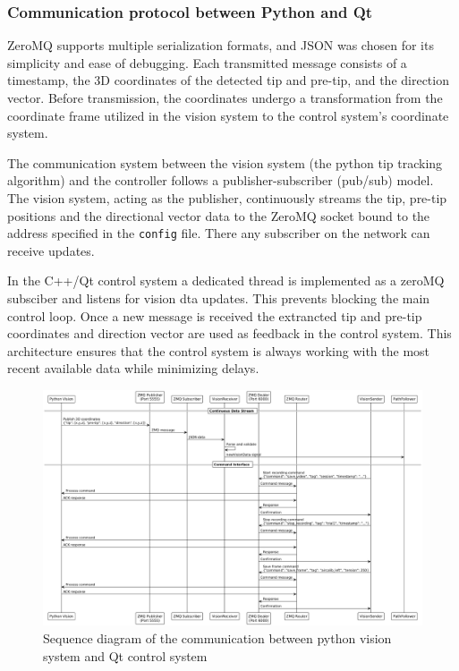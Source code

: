 
\subsubsection{Communication protocol between Python and Qt}
ZeroMQ supports multiple serialization formats, and JSON was chosen for its simplicity and ease of debugging. Each transmitted message consists of a timestamp, the 3D coordinates of the detected tip and pre-tip, and the direction vector. Before transmission, the coordinates undergo a transformation from the coordinate frame utilized in the vision system to the control system's coordinate system. 

The communication system between the vision system (the python tip tracking algorithm) and the controller follows a publisher-subscriber (pub/sub) model. The vision system, acting as the publisher, continuously streams the tip, pre-tip positions and the directional vector data to the ZeroMQ socket bound to the address specified in the \texttt{config} file. There any subscriber on the network can receive updates. 

In the C++/Qt control system a dedicated thread is implemented as a zeroMQ subsciber and listens for vision dta updates. This prevents blocking the main control loop. Once a new message is received the extrancted tip and pre-tip coordinates and direction vector are used as feedback in the control system. This architecture ensures that the control system is always working with the most recent available data while minimizing delays.

\begin{figure} [H]
    \centering
    \includegraphics[width=1.1\linewidth]{images/Software documentation/visionSequencediag.png}
    \caption{Sequence diagram of the communication between python vision system and Qt control system}
    \label{fig:seqComm}
\end{figure}



